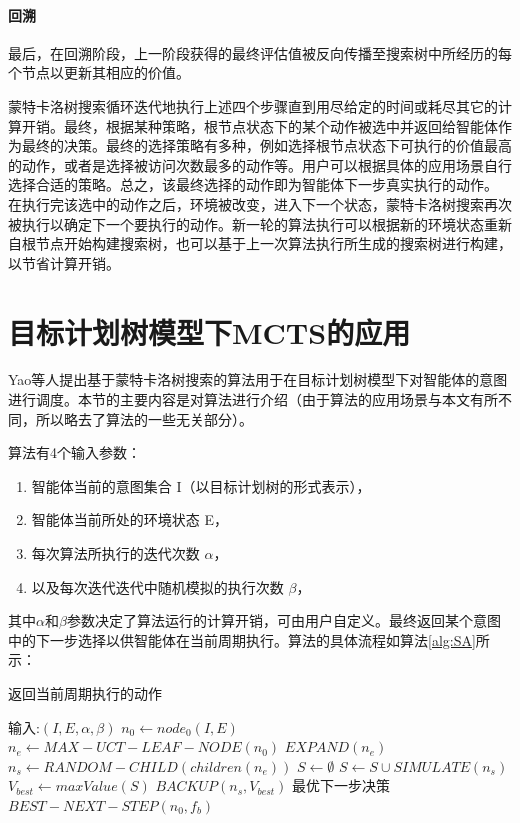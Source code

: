 \paragraph{回溯}
最后，在回溯阶段，上一阶段获得的最终评估值被反向传播至搜索树中所经历的每个节点以更新其相应的价值。

蒙特卡洛树搜索循环迭代地执行上述四个步骤直到用尽给定的时间或耗尽其它的计算开销。最终，根据某种策略，根节点状态下的某个动作被选中并返回给智能体作为最终的决策。最终的选择策略有多种，例如选择根节点状态下可执行的价值最高的动作，或者是选择被访问次数最多的动作等。用户可以根据具体的应用场景自行选择合适的策略。总之，该最终选择的动作即为智能体下一步真实执行的动作。
%
在执行完该选中的动作之后，环境被改变，进入下一个状态，蒙特卡洛树搜索再次被执行以确定下一个要执行的动作。新一轮的算法执行可以根据新的环境状态重新自根节点开始构建搜索树，也可以基于上一次算法执行所生成的搜索树进行构建，以节省计算开销。


\section{目标计划树模型下MCTS的应用}\label{SA}
Yao等人提出基于蒙特卡洛树搜索的\SA \cite{DBLP:conf/atal/YaoL16}算法用于在目标计划树模型下对智能体的意图进行调度。本节的主要内容是对\SA 算法进行介绍（由于\SA 算法的应用场景与本文有所不同，所以略去了算法的一些无关部分）。

\SA 算法有4个输入参数：
\begin{enumerate}
  \item 智能体当前的意图集合 I（以目标计划树的形式表示），
  \item 智能体当前所处的环境状态 E，
  \item 每次算法所执行的迭代次数 $\alpha$， 
  \item 以及每次迭代迭代中随机模拟的执行次数 $\beta$，
\end{enumerate}
其中$\alpha$和$\beta$参数决定了算法运行的计算开销，可由用户自定义。\SA 最终返回某个意图中的下一步选择以供智能体在当前周期执行。\SA 算法的具体流程如算法\ref{alg:SA}所示：

\begin{algorithm}
\caption{返回当前周期执行的动作}\label{alg:SA}
  \begin{algorithmic}[1]
    \STATE 输入:$(I, E,\alpha,\beta)$
    \STATE $n_0 \gets node_0(I,E)$ \label{root}
     \label{iteration begin}
      \STATE $n_e \gets MAX-UCT-LEAF-NODE(n_0)$ \label{selection}
      \STATE $EXPAND(n_e)$ \label{expansion}
      \STATE $n_s \gets RANDOM-CHILD(children(n_e))$ \label{simulation begin}
      \STATE $S \gets \emptyset$
        \STATE $S \gets S \cup SIMULATE(n_s)$
      \ENDFOR \label{simulation end}
      \STATE $V_{best} \gets maxValue(S)$
      \STATE $BACKUP(n_s, V_{best})$ \label{back}
      \ENDFOR \label{iteration end}
      \STATE \RETURN 最优下一步决策 $BEST-NEXT-STEP(n_0, f_b)$
  \end{algorithmic}
\end{algorithm}

